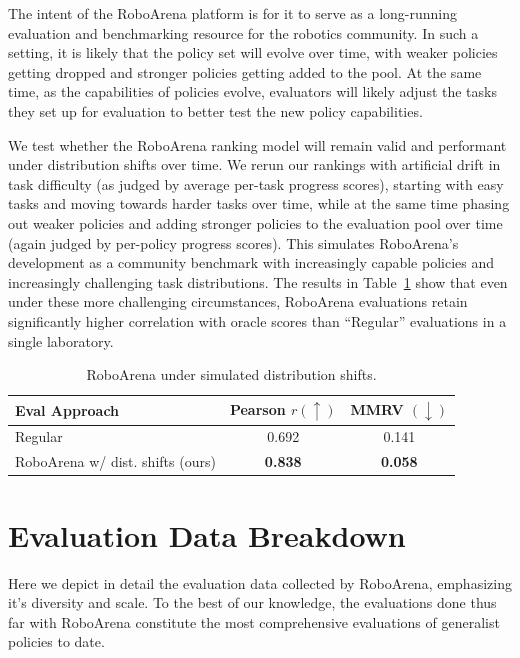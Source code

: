 The intent of the RoboArena platform is for it to serve as a long-running evaluation and benchmarking resource for the robotics community. In such a setting, it is likely that the policy set will evolve over time, with weaker policies getting dropped and stronger policies getting added to the pool. At the same time, as the capabilities of policies evolve, evaluators will likely adjust the tasks they set up for evaluation to better test the new policy capabilities. 

We test whether the RoboArena ranking model will remain valid and performant under distribution shifts over time. We rerun our rankings  with artificial drift in task difficulty (as judged by average per-task progress scores), starting with easy tasks and moving towards harder tasks over time, while at the same time phasing out weaker policies and adding stronger policies to the evaluation pool over time (again judged by per-policy progress scores). This simulates RoboArena’s development as a community benchmark with increasingly capable policies and increasingly challenging task distributions. The results in Table~\ref{tab:ranking_under_dist_shifts} show that even under these more challenging circumstances, RoboArena evaluations retain significantly higher correlation with oracle scores than “Regular” evaluations in a single laboratory.

\begin{table}[H]
\centering
\begin{tabular}{lcc}
\toprule
\textbf{Eval Approach}              & \textbf{Pearson} $r (\uparrow)$           & \textbf{MMRV} $(\downarrow)$             \\
\midrule
Regular              & 0.692               & 0.141         \\
RoboArena w/ dist. shifts (ours)         & \textbf{0.838}                 & \textbf{0.058}           \\
\bottomrule
\end{tabular}
\vspace{0.1cm}
\caption{RoboArena under simulated distribution shifts.}
\label{tab:ranking_under_dist_shifts}
\end{table}


\section{Evaluation Data Breakdown}
\label{app:detailed_eval_breakdown}


Here we depict in detail the evaluation data collected by RoboArena, emphasizing it's diversity and scale. To the best of our knowledge, the evaluations done thus far with RoboArena constitute the most comprehensive evaluations of generalist policies to date. 

